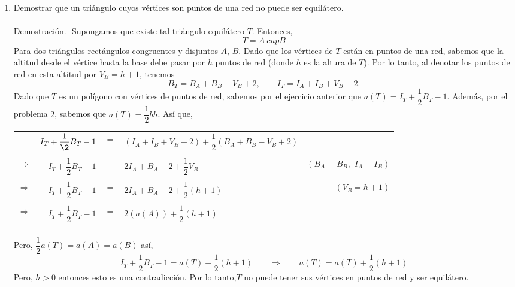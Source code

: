 \begin{enumerate}
\begin{enumerate}[\bfseries (a)]
	    \end{enumerate}

	\item Demostrar que un triángulo cuyos vértices son puntos de una red no puede ser equilátero.\\\\
	Demostración.-\; Supongamos que existe tal triángulo equilátero $T$. Entonces, $$T = A \ cup B$$ 
	Para dos triángulos rectángulos congruentes y disjuntos $A$, $B$. Dado que los vértices de $T$ están en puntos de una red, sabemos que la altitud desde el vértice hasta la base debe pasar por $h$ puntos de red (donde $h$ es la altura de $T$). Por lo tanto, al denotar los puntos de red en esta altitud por $V_B = h + 1$, tenemos
	$$B_T = B_A + B_B -V_B + 2, \qquad I_T = I_A + I_B + V_B - 2.$$ 
	Dado que $T$ es un polígono con vértices de puntos de red, sabemos por el ejercicio anterior que $a(T) = I_T + \dfrac{1}{2} B_T -1$. Además, por el problema $2$, sabemos que $a(T) = \dfrac{1}{2} bh$. Así que,
	\begin{center}
	    \begin{tabular}{crclr}
		& $I_T + \dfrac{1}{\2} B_T - 1$ & $=$ & $(I_A + I_B + V_B - 2) + \dfrac{1}{2}(B_A + B_B - V_B + 2)$ &\\\\
		$\Rightarrow$ & $I_T + \dfrac{1}{2} B_T - 1$ & $=$ & $2I_A + B_A - 2 + \dfrac{1}{2} V_B$ & $(B_A=B_B, \,\, I_A=I_B)$\\\\
		$\Rightarrow$ & $I_T + \dfrac{1}{2} B_T - 1$ & $=$ & $2I_A + B_A - 2 + \dfrac{1}{2}(h+1)$ & $(V_B = h + 1)$\\\\
		$\Rightarrow$ & $I_T + \dfrac{1}{2} B_T - 1$ & $=$ & $2(a(A)) + \dfrac{1}{2}(h+1)$ &\\\\
	    \end{tabular}
	\end{center}
	Pero, $\dfrac{1}{2} a(T)=a(A)=a(B)$ así,
	$$I_T + \dfrac{1}{2} B_T - 1 = a(T) + \dfrac{1}{2}(h+1) \qquad \Rightarrow \qquad a(T)=a(T) + \dfrac{1}{2}(h+1)$$
	Pero, $h > 0$ entonces esto es una contradicción. Por lo tanto,$T$ no puede tener sus vértices en puntos de red y ser equilátero.\\\\


\end{enumerate}
